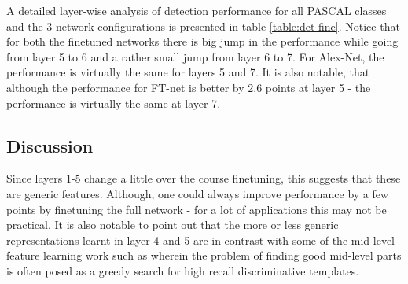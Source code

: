 A detailed layer-wise analysis of detection performance for all PASCAL classes and the 3 network configurations is presented in table \ref{table:det-fine}. Notice that for both the finetuned networks there is big jump in the performance while going from layer 5 to 6 and a rather small jump from layer 6 to 7. For Alex-Net, the performance is virtually the same for layers 5 and 7. It is also notable, that although the performance for FT-net is better by 2.6 points at layer 5 - the performance is virtually the same at layer 7. 
\subsection{Discussion}
\label{sub:fine-discussion}
Since layers 1-5 change a little over the course finetuning, this suggests that these are generic features. Although, one could always improve performance by a few points by finetuning the full network - for a lot of applications this may not be practical. 
It is also notable to point out that the more or less generic representations learnt in layer 4 and 5 are in contrast with some of the mid-level feature learning work such as \cite{Blocks} \cite{Mid1} wherein the problem of finding good mid-level parts is often posed as a greedy search for high recall discriminative templates.